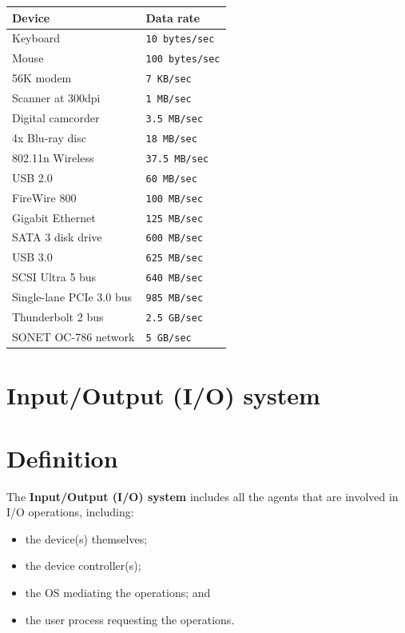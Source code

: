 \documentclass[a4paper]{systems-software}
\begin{document}
\begin{longtabu} to \textwidth {| X[1,l] | X[1,l] |}
    \hline
    \textbf{Device} & \textbf{Data rate}
	\\ \hline
	Keyboard & \texttt{10 bytes/sec}
	\\ \hline
	Mouse & \texttt{100 bytes/sec}
	\\ \hline
	56K modem & \texttt{7 KB/sec}
	\\ \hline
	Scanner at 300dpi & \texttt{1 MB/sec}
	\\ \hline
	Digital camcorder & \texttt{3.5 MB/sec}
	\\ \hline
	4x Blu-ray disc & \texttt{18 MB/sec}
	\\ \hline
	802.11n Wireless & \texttt{37.5 MB/sec}
	\\ \hline
	USB 2.0 & \texttt{60 MB/sec}
	\\ \hline
	FireWire 800 & \texttt{100 MB/sec}
	\\ \hline
	Gigabit Ethernet & \texttt{125 MB/sec}
	\\ \hline
	SATA 3 disk drive & \texttt{600 MB/sec}
	\\ \hline
	USB 3.0 & \texttt{625 MB/sec}
	\\ \hline
	SCSI Ultra 5 bus & \texttt{640 MB/sec}
	\\ \hline
	Single-lane PCIe 3.0 bus & \texttt{985 MB/sec}
	\\ \hline
	Thunderbolt 2 bus & \texttt{2.5 GB/sec}
	\\ \hline
	SONET OC-786 network & \texttt{5 GB/sec}
	\\ \hline
\end{longtabu}


\section{Input/Output (I/O) system}

\section*{Definition}

The \textbf{Input/Output (I/O) system} includes all the agents that are involved in I/O operations, including:
\begin{itemize}
	\item the device(s) themselves;
	\item the device controller(s);
	\item the OS mediating the operations; and
	\item the user process requesting the operations.
\end{itemize}
\end{document}
